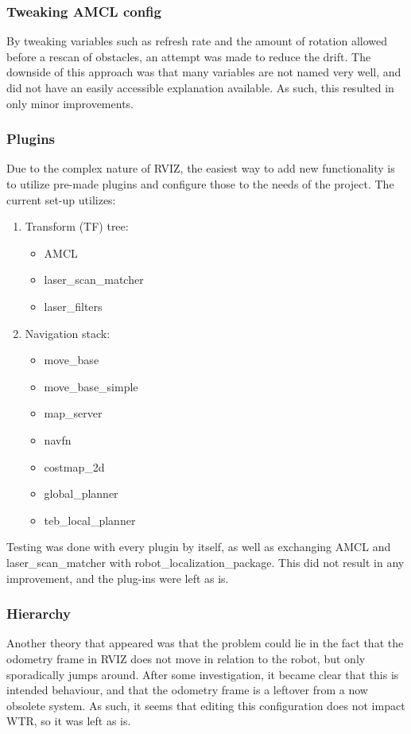 \subsubsection{Tweaking AMCL config}
\label{subs::AMCL}
By tweaking variables such as refresh rate and the amount of rotation allowed before a rescan of obstacles, an attempt was made to reduce the drift.
The downside of this approach was that many variables are not named very well, and did not have an easily accessible explanation available.
As such, this resulted in only minor improvements.

\subsubsection{Plugins} 
\label{subs::plugins}
Due to the complex nature of RVIZ, the easiest way to add new functionality is to utilize pre-made plugins and configure those to the needs of the project.
The current set-up utilizes:
\begin{enumerate}
\item Transform (TF) tree:
    \begin{itemize}
    \item AMCL
    \item laser\_scan\_matcher
    \item laser\_filters
\end{itemize}
\item Navigation stack:
\begin{itemize}
\item move\_base
\item move\_base\_simple
\item map\_server
\item navfn
\item costmap\_2d
\item global\_planner
\item teb\_local\_planner
\end{itemize}
\end{enumerate}
Testing was done with every plugin by itself, as well as exchanging AMCL and laser\_scan\_matcher with robot\_localization\_package.
This did not result in any improvement, and the plug-ins were left as is.

\subsubsection{Hierarchy}
\label{subs::hier}
Another theory that appeared was that the problem could lie in the fact that the odometry frame in RVIZ does not move in relation to the robot, but only sporadically jumps around.
After some investigation, it became clear that this is intended behaviour, and that the odometry frame is a leftover from a now obsolete system.
As such, it seems that editing this configuration does not impact WTR, so it was left as is.

